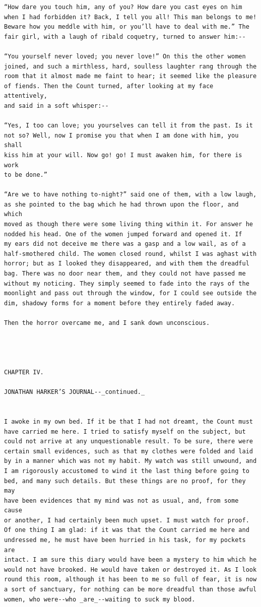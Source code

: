 \documentclass{article}
\begin{document}
\begin{verbatim}
“How dare you touch him, any of you? How dare you cast eyes on him
when I had forbidden it? Back, I tell you all! This man belongs to me!
Beware how you meddle with him, or you’ll have to deal with me.” The
fair girl, with a laugh of ribald coquetry, turned to answer him:--

“You yourself never loved; you never love!” On this the other women
joined, and such a mirthless, hard, soulless laughter rang through the
room that it almost made me faint to hear; it seemed like the pleasure
of fiends. Then the Count turned, after looking at my face attentively,
and said in a soft whisper:--

“Yes, I too can love; you yourselves can tell it from the past. Is it
not so? Well, now I promise you that when I am done with him, you shall
kiss him at your will. Now go! go! I must awaken him, for there is work
to be done.”

“Are we to have nothing to-night?” said one of them, with a low laugh,
as she pointed to the bag which he had thrown upon the floor, and which
moved as though there were some living thing within it. For answer he
nodded his head. One of the women jumped forward and opened it. If
my ears did not deceive me there was a gasp and a low wail, as of a
half-smothered child. The women closed round, whilst I was aghast with
horror; but as I looked they disappeared, and with them the dreadful
bag. There was no door near them, and they could not have passed me
without my noticing. They simply seemed to fade into the rays of the
moonlight and pass out through the window, for I could see outside the
dim, shadowy forms for a moment before they entirely faded away.

Then the horror overcame me, and I sank down unconscious.




CHAPTER IV.

JONATHAN HARKER’S JOURNAL--_continued._


I awoke in my own bed. If it be that I had not dreamt, the Count must
have carried me here. I tried to satisfy myself on the subject, but
could not arrive at any unquestionable result. To be sure, there were
certain small evidences, such as that my clothes were folded and laid
by in a manner which was not my habit. My watch was still unwound, and
I am rigorously accustomed to wind it the last thing before going to
bed, and many such details. But these things are no proof, for they may
have been evidences that my mind was not as usual, and, from some cause
or another, I had certainly been much upset. I must watch for proof.
Of one thing I am glad: if it was that the Count carried me here and
undressed me, he must have been hurried in his task, for my pockets are
intact. I am sure this diary would have been a mystery to him which he
would not have brooked. He would have taken or destroyed it. As I look
round this room, although it has been to me so full of fear, it is now
a sort of sanctuary, for nothing can be more dreadful than those awful
women, who were--who _are_--waiting to suck my blood.


\end{verbatim}
\end{document}

